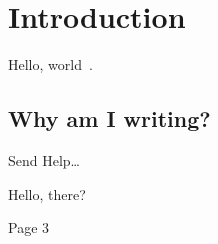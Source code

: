 \documentclass[ispdf]{usydthesis}
\begin{document}
\pagestyle{empty}
\tableofcontents

\pagestyle{empty}
\newpage
{}
{}
\listoffigures

\newpage
{}
{}
\pagestyle{empty}
\listoftables

\endgroup

\pagestyle{fancybook}
\cleardoublepage{}

\thispagestyle{fancybook}

\chapter{Introduction}

Hello, world~\cite{Nakamoto08-Bitcoin}.

\section{Why am I writing?}

Send Help\ldots

\newpage

Hello, there?

\newpage

Page 3

\cleardoublepage
{}
{}
\printbibliography
\end{document}
